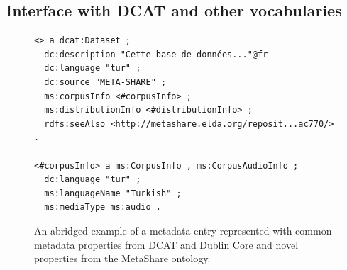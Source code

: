 \documentclass{llncs}
\begin{document}
\subsection{Interface with DCAT and other vocabularies}

\begin{figure}
    {\footnotesize
    \begin{verbatim}
<> a dcat:Dataset ;
  dc:description "Cette base de données..."@fr
  dc:language "tur" ;
  dc:source "META-SHARE" ;
  ms:corpusInfo <#corpusInfo> ;
  ms:distributionInfo <#distributionInfo> ;
  rdfs:seeAlso <http://metashare.elda.org/reposit...ac770/> .

<#corpusInfo> a ms:CorpusInfo , ms:CorpusAudioInfo ;
  dc:language "tur" ;
  ms:languageName "Turkish" ;
  ms:mediaType ms:audio .

\end{verbatim}}
\caption{An abridged example of a metadata entry represented with common metadata
    properties from DCAT and Dublin Core and novel properties from the MetaShare
ontology.\label{fig:example-dcat}}
\end{figure}
\end{document}
